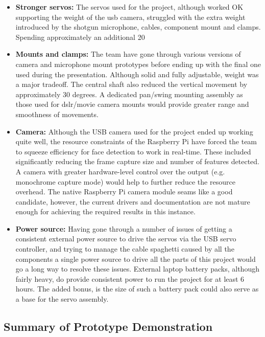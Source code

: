 \documentclass[11pt,a4paper,titlepage]{report}
\begin{document}
\begin{itemize}
    \item \textbf{Stronger servos:} The servos used for the project, although worked OK supporting the weight of the usb camera, struggled with the extra weight introduced by the shotgun microphone, cables, component mount and clamps. Spending approximately an additional 20%

    \item \textbf{Mounts and clamps:} The team have gone through various versions of camera and microphone mount prototypes before ending up with the final one used during the presentation. Although solid and fully adjustable, weight was a major tradeoff. The central shaft also reduced the vertical movement by approximately 30 degrees. A dedicated pan/swing mounting assembly as those used for dslr/movie camera mounts would provide greater range and smoothness of movements.

    \item \textbf{Camera:} Although the USB camera used for the project ended up working quite well, the resource constraints of the Raspberry Pi have forced the team to squeeze efficiency for face detection to work in real-time. These included significantly reducing the frame capture size and number of features detected. A camera with greater hardware-level control over the output (e.g. monochrome capture mode) would help to further reduce the resource overhead. The native Raspberry Pi camera module seams like a good candidate, however, the current drivers and documentation are not mature enough for achieving the required results in this instance.

    \item \textbf{Power source:} Having gone through a number of issues of getting a consistent external power source to drive the servos via the USB servo controller, and trying to manage the cable spaghetti caused by all the components a single power source to drive all the parts of this project would go a long way to resolve these issues. External laptop battery packs, although fairly heavy, do provide consistent power to run the project for at least 6 hours. The added bonus, is the size of such a battery pack could also serve as a base for the servo assembly.
\end{itemize}


\subsection{Summary of Prototype Demonstration}
\end{document}
